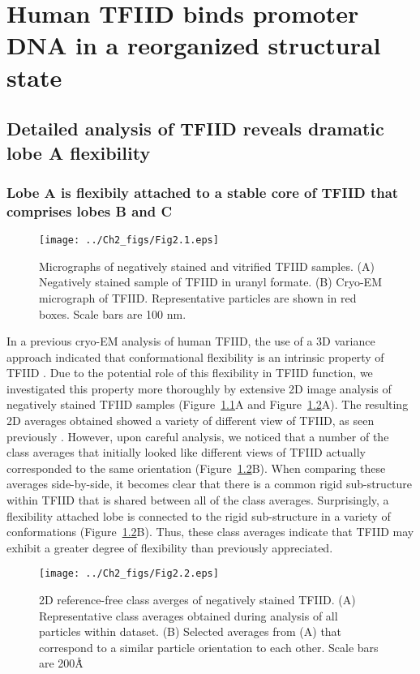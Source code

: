 \chapter{Human TFIID binds promoter DNA in a reorganized structural state}

\section{Detailed analysis of TFIID reveals dramatic lobe A flexibility}

\subsection{Lobe A is flexibily attached to a stable core of TFIID that comprises lobes B and C} 
\begin{figure}
\centering
\texttt{[image: ../Ch2\_figs/Fig2.1.eps]}
\caption[Micrographs of negatively stained and vitrified TFIID samples]{Micrographs of negatively stained and vitrified TFIID samples. (A) Negatively stained sample of TFIID in uranyl formate.  (B) Cryo-EM micrograph of TFIID.  Representative particles are shown in red boxes.  Scale bars are 100 nm.} 
\label{fig:Fig2.1}
\end{figure}
In a previous cryo-EM analysis of human TFIID, the use of a 3D variance approach indicated that conformational flexibility is an intrinsic property of TFIID \cite{Grob_1281}. Due to the potential role of this flexibility in TFIID function, we investigated this property more thoroughly by extensive 2D image analysis of negatively stained TFIID samples (Figure~\ref{fig:Fig2.1}A and Figure~\ref{fig:Fig2.2}A). The resulting 2D averages obtained showed a variety of different view of TFIID, as seen previously \cite{Grob_1281}. However, upon careful analysis, we noticed that a number of the class averages that initially looked like different views of TFIID actually corresponded to the same orientation (Figure~\ref{fig:Fig2.2}B). When comparing these averages side-by-side, it becomes clear that there is a common rigid sub-structure within TFIID that is shared between all of the class averages. Surprisingly, a flexibility attached lobe is connected to the rigid sub-structure in a variety of conformations (Figure~\ref{fig:Fig2.2}B). Thus, these class averages indicate that TFIID may exhibit a greater degree of flexibility than previously appreciated.\\
\begin{figure}
\centering
\texttt{[image: ../Ch2\_figs/Fig2.2.eps]}
\caption[2D reference-free class averges of negatively stained TFIID]{2D reference-free class averges of negatively stained TFIID. (A) Representative class averages obtained during analysis of all particles within dataset. (B) Selected averages from (A) that correspond to a similar particle orientation to each other. Scale bars are 200\AA\.} 
\label{fig:Fig2.2}
\end{figure}
